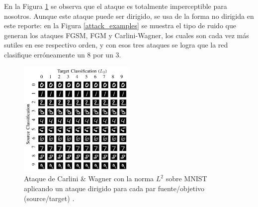 En la Figura \ref{CW} se observa que el ataque es totalmente imperceptible para nosotros. Aunque este ataque puede ser dirigido, se usa de la forma no dirigida en este reporte: en la Figura \ref{attack_examples} se muestra el tipo de ruido que generan los ataques FGSM, FGM y Carlini-Wagner, los cuales son cada vez más sutiles en ese respectivo orden, y con esos tres ataques se logra que la red clasifique erróneamente un 8 por un 3.

\begin{figure}[h!]
    \centering
    \includegraphics[width=0.5\textwidth]{images/CW/CW_L2.png}
    \caption{Ataque de Carlini \& Wagner con la norma $L^2$ sobre MNIST aplicando un ataque dirigido para cada par fuente/objetivo (source/target) \cite{carlini2017evaluating}.}
    \label{CW}
\end{figure}


